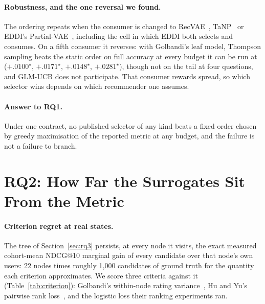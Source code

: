 \documentclass[runningheads]{llncs}
\begin{document}
\paragraph{Robustness, and the one reversal we found.}
The ordering repeats when the consumer is changed to RecVAE~\cite{ren2020recvae},
TaNP~\cite{lin2021tanp} or EDDI's Partial-VAE~\cite{ma2019eddi}, including the cell in which EDDI both selects and consumes. On a
fifth consumer it reverses: with Golbandi's leaf model, Thompson sampling beats the static order on
full accuracy at every budget it can be run at ($+.0100^\star$, $+.0171^\star$, $+.0148^\star$,
$+.0281^\star$), though not on the tail at four questions, and GLM-UCB does not participate. That
consumer rewards spread, so which selector wins depends on which recommender one assumes.

\paragraph{Answer to RQ1.}
Under one contract, no published selector of any kind beats a fixed order chosen by greedy
maximisation of the reported metric at any budget, and the failure is not a failure to branch.

\section{RQ2: How Far the Surrogates Sit From the Metric}
\label{sec:rq2}

\paragraph{Criterion regret at real states.}
The tree of Section~\ref{sec:rq3} persists, at every node it visits, the exact measured cohort-mean
NDCG@10 marginal gain of every candidate over that node's own users: 22 nodes times roughly 1{,}000
candidates of ground truth for the quantity each criterion approximates. We score three criteria
against it (Table~\ref{tab:criterion}): Golbandi's within-node rating
variance~\cite{golbandi2011adaptive}, Hu and Yu's pairwise rank loss~\cite{hu2013interview}, and the
logistic loss their ranking experiments ran.
\end{document}

